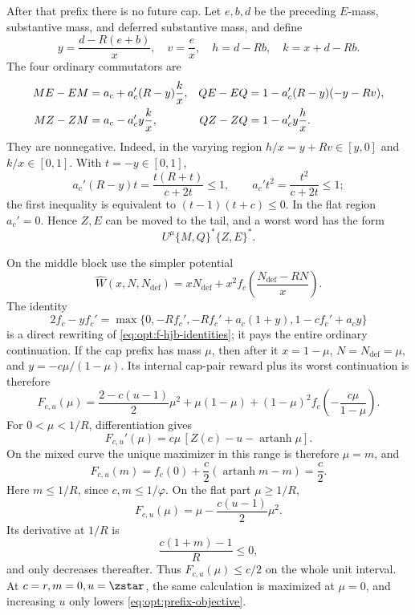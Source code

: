 {After that prefix there is no future cap.  Let $e,b,d$ be the preceding
$E$-mass, substantive mass, and deferred substantive mass, and define
\[
 y=\frac{d-R(e+b)}x,
 \quad v=\frac ex,
 \quad h=d-Rb,
 \quad k=x+d-Rb.
\]
The four ordinary commutators are
\begin{align}
 ME-EM&=a_c+a_c'(R-y)\frac{k}{x},
 &QE-EQ&=1-a_c'(R-y)(-y-Rv),
 \notag\\
 MZ-ZM&=a_c-a_c'y\frac{k}{x},
 &QZ-ZQ&=1-a_c'y\frac{h}{x}.
 \label{eq:opt:ordinary-commutators}
\end{align}
They are nonnegative.  Indeed, in the varying region
$h/x=y+Rv\in[y,0]$ and $k/x\in[0,1]$.  With $t=-y\in[0,1]$,
\begin{equation}
 a_c'(R-y)t=\frac{t(R+t)}{c+2t}\le1,
 \qquad
 a_c't^2=\frac{t^2}{c+2t}\le1;
 \label{eq:opt:ordinary-commutator-signs}
\end{equation}
the first inequality is equivalent to
$(t-1)(t+c)\le0$.  In the flat region $a_c'=0$.  Hence $Z,E$ can be
moved to the tail, and a worst word has the form
\begin{equation}
 U^\mu\{M,Q\}^*\{Z,E\}^*.
 \label{eq:opt:canonical-word}
\end{equation}

On the middle block use the simpler potential
\[
 \widehat W(x,N,N_{\mathrm{def}})=xN_{\mathrm{def}}+x^2f_c\!\left(\frac{N_{\mathrm{def}}-RN}{x}\right).
\]
The identity
\begin{equation}
 2f_c-yf_c'
 =\max\{0,-Rf_c',-Rf_c'+a_c(1+y),
              1-cf_c'+a_cy\}
 \label{eq:opt:ordinary-HJB}
\end{equation}
is a direct rewriting of \eqref{eq:opt:f-hjb-identities}; it pays the
entire ordinary continuation.  If the cap prefix has mass $\mu$, then
after it $x=1-\mu$, $N=N_{\mathrm{def}}=\mu$, and
$y=-c\mu/(1-\mu)$.  Its internal cap-pair reward plus its worst
continuation is therefore
\begin{equation}
 F_{c,u}(\mu)
 =\frac{2-c(u-1)}2\mu^2+\mu(1-\mu)
 +(1-\mu)^2f_c\!\left(-\frac{c\mu}{1-\mu}\right).
 \label{eq:opt:prefix-objective}
\end{equation}
For $0<\mu<1/R$, differentiation gives
\begin{equation}
 F_{c,u}'(\mu)
 =c\mu\,[Z(c)-u-\operatorname{artanh}\mu].
 \label{eq:opt:prefix-derivative}
\end{equation}
On the mixed curve the unique maximizer in this range is therefore
$\mu=m$, and
\begin{equation}
 F_{c,u}(m)
 =f_c(0)+\frac c2(\operatorname{artanh}m-m)=\frac c2.
 \label{eq:opt:prefix-maximum}
\end{equation}
Here $m\le1/R$, since $c,m\le1/\varphi$.  On the flat part
$\mu\ge1/R$,
\begin{equation}
 F_{c,u}(\mu)=\mu-\frac{c(u-1)}2\mu^2.
 \label{eq:opt:prefix-flat}
\end{equation}
Its derivative at $1/R$ is
\[
 \frac{c(1+m)-1}{R}\le0,
\]
and only decreases thereafter.  Thus $F_{c,u}(\mu)\le c/2$ on the whole
unit interval.  At $c=r,m=0,u=\zstar$, the same calculation is maximized at
$\mu=0$, and increasing $u$ only lowers
\eqref{eq:opt:prefix-objective}.

}
